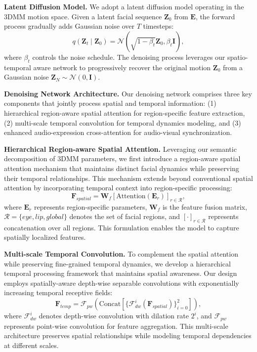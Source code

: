 \documentclass[conference]{IEEEtran}
\begin{document}
\noindent \textbf{Latent Diffusion Model.} We adopt a latent diffusion model \cite{latentdiffu} operating in the 3DMM motion space. Given a latent facial sequence $\mathbf{Z}_0$ from $\mathbf{E}$, the forward process gradually adds Gaussian noise over $T$ timesteps:
\begin{equation}
q(\mathbf{Z}_t \mid \mathbf{Z}_{0}) = \mathcal{N}(\sqrt{1 - \beta_t} \mathbf{Z}_{0}, \beta_t \mathbf{I}),
\end{equation}
where $\beta_t$ controls the noise schedule. The denoising process leverages our spatio-temporal aware network to progressively recover the original motion $\mathbf{Z}_0$ from a Gaussian noise $\mathbf{Z}_N \sim \mathcal{N}(0, \mathbf{I})$.

\noindent \textbf{Denoising Network Architecture.} Our denoising network comprises three key components that jointly process spatial and temporal information: (1) hierarchical region-aware spatial attention for region-specific feature extraction, (2) multi-scale temporal convolution for temporal dynamics modeling, and (3) enhanced audio-expression cross-attention for audio-visual synchronization.

\noindent \textbf{Hierarchical Region-aware Spatial Attention.} 
Leveraging our semantic decomposition of 3DMM parameters, we first introduce a region-aware spatial attention mechanism that maintains distinct facial dynamics while preserving their temporal relationships. This mechanism extends beyond conventional spatial attention by incorporating temporal context into region-specific processing:
\begin{equation}
    \mathbf{F}_{spatial} = \mathbf{W}_f[\text{Attention}(\mathbf{E}_r)]_{r \in \mathcal{R}},
\end{equation}
where $\mathbf{E}_r$ represents region-specific parameters,  $\mathbf{W}_f$ is the feature fusion matrix, $\mathcal{R}=\{eye, lip, global\}$ denotes the set of facial regions, and $[\cdot]_{r \in \mathcal{R}}$ represents concatenation over all regions. This formulation enables the model to capture spatially localized features.  

\noindent \textbf{Multi-scale Temporal Convolution.} 
To complement the spatial attention while preserving fine-grained temporal dynamics, we develop a hierarchical temporal processing framework that maintains spatial awareness. Our design employs spatially-aware depth-wise separable convolutions with exponentially increasing temporal receptive fields:
\begin{equation}
    \mathbf{F}_{temp} = \mathcal{F}_{pw}(\text{Concat}[\{\mathcal{F}_{dw}^i(\mathbf{F}_{spatial})\}_{i=0}^2]),
\end{equation}
where $\mathcal{F}_{dw}^i$ denotes depth-wise convolution with dilation rate $2^i$, and $\mathcal{F}_{pw}$ represents point-wise convolution for feature aggregation. This multi-scale architecture preserves spatial relationships while modeling temporal dependencies at different scales.
\end{document}

